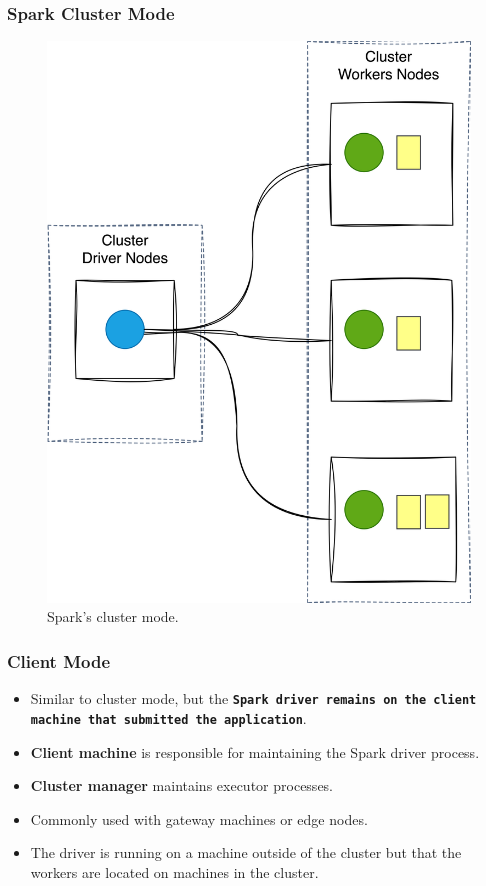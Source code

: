 %
\begin{frame}
    \frametitle{Spark Cluster Mode}
    \begin{figure}
        \includegraphics[width=\textwidth,height=.7\textheight,keepaspectratio]{./Figures/chapter-04/spark_cluster_mode}
        \caption{Spark’s cluster mode.}\label{fig:cluster_mode}
    \end{figure}
\end{frame}
%
\begin{frame}
    \frametitle{Client Mode}
    \begin{itemize}
        \item Similar to cluster mode, but the \textbf{\texttt{Spark driver remains on the client
        machine that submitted the application}}.
        \item \textbf{Client machine} is responsible for maintaining the Spark driver process.
        \item \textbf{Cluster manager} maintains executor processes.
        \item Commonly used with gateway machines or edge nodes.
        \item The driver is running on a machine outside of the cluster but that the workers are located on machines in the cluster.
    \end{itemize}
\end{frame}
